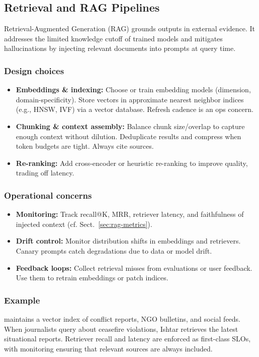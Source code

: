 \subsection{Retrieval and RAG Pipelines}
\label{subsec:rag}

Retrieval-Augmented Generation (RAG) grounds outputs in external evidence. It addresses the limited knowledge cutoff of trained models and mitigates hallucinations by injecting relevant documents into prompts at query time.

\subsubsection{Design choices}
\begin{itemize}
    \item \textbf{Embeddings \& indexing:} Choose or train embedding models (dimension, domain-specificity). Store vectors in approximate nearest neighbor indices (e.g., HNSW, IVF) via a vector database. Refresh cadence is an ops concern.
    \item \textbf{Chunking \& context assembly:} Balance chunk size/overlap to capture enough context without dilution. Deduplicate results and compress when token budgets are tight. Always cite sources.
    \item \textbf{Re-ranking:} Add cross-encoder or heuristic re-ranking to improve quality, trading off latency.
\end{itemize}

\subsubsection{Operational concerns}
\begin{itemize}
    \item \textbf{Monitoring:} Track recall@K, MRR, retriever latency, and faithfulness of injected context (cf. Sect.~\ref{sec:rag-metrics}).
    \item \textbf{Drift control:} Monitor distribution shifts in embeddings and retrievers. Canary prompts catch degradations due to data or model drift.
    \item \textbf{Feedback loops:} Collect retrieval misses from evaluations or user feedback. Use them to retrain embeddings or patch indices.
\end{itemize}

\subsubsection{Example}
\ishtar{} maintains a vector index of conflict reports, NGO bulletins, and social feeds. When journalists query about ceasefire violations, Ishtar retrieves the latest situational reports. Retriever recall and latency are enforced as first-class SLOs, with monitoring ensuring that relevant sources are always included.  

